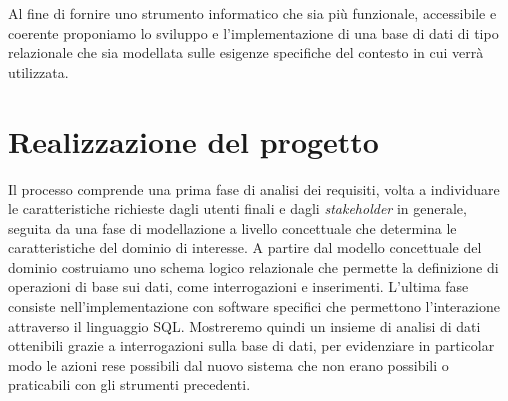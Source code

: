 Al fine di fornire uno strumento informatico che sia più funzionale, accessibile e coerente proponiamo lo sviluppo e l'implementazione di una base di dati di tipo relazionale che sia modellata sulle esigenze specifiche del contesto in cui verrà utilizzata.

\section{Realizzazione del progetto}
\label{realization}

Il processo comprende una prima fase di analisi dei requisiti, volta a individuare le caratteristiche richieste dagli utenti finali e dagli \emph{stakeholder} in generale, seguita da una fase di modellazione a livello concettuale che determina le caratteristiche del dominio di interesse.
A partire dal modello concettuale del dominio costruiamo uno schema logico relazionale che permette la definizione di operazioni di base sui dati, come interrogazioni e inserimenti.
L'ultima fase consiste nell'implementazione con software specifici che permettono l'interazione attraverso il linguaggio SQL.
Mostreremo quindi un insieme di analisi di dati ottenibili grazie a interrogazioni sulla base di dati, per evidenziare in particolar modo le azioni rese possibili dal nuovo sistema che non erano possibili o praticabili con gli strumenti precedenti.

